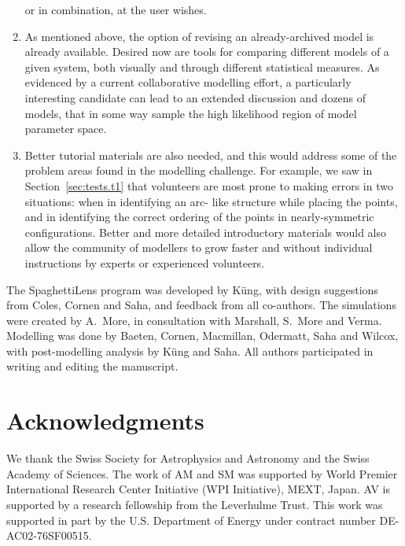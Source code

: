 \documentclass[usenatbib]{mn2e}
\newcommand{\spl}{SpaghettiLens\xspace}
\newcommand{\secref}[1]{Section~\ref{sec:#1}}
\begin{document}
\begin{enumerate}
  or in combination, at the user wishes.
\item As mentioned above, the option of revising an already-archived
  model is already available.  Desired now are tools for comparing
  different models of a given system, both visually and through
  different statistical measures.  As evidenced by a current
  collaborative modelling effort, a particularly interesting candidate
  can lead to an extended discussion and dozens of models, that
  in some way sample the high likelihood region of model parameter
  space.
\item Better tutorial materials are also needed, and this would
  address some of the problem areas found in the modelling challenge.
  For example, we saw in \secref{tests.t1} that volunteers are most
  prone to making errors in two situations: when in identifying an arc-
  like structure while placing the points, and in identifying the
  correct ordering of the points in nearly-symmetric configurations.
  Better and more detailed introductory materials would also allow
  the community of modellers to grow faster and without individual
  instructions by experts or experienced volunteers.
\end{enumerate}

The \spl program was developed by Küng, with design suggestions from
Coles, Cornen and Saha, and feedback from all co-authors.  The
simulations were created by A.~More, in consultation with Marshall,
S.~More and Verma.  Modelling was done by Baeten, Cornen, Macmillan,
Odermatt, Saha and Wilcox, with post-modelling analysis by Küng and
Saha.  All authors participated in writing and editing the manuscript.



\section*{Acknowledgments}

We thank the Swiss Society for Astrophysics and Astronomy and the
Swiss Academy of Sciences. The work of AM and SM was supported by
World Premier International Research Center Initiative (WPI
Initiative), MEXT, Japan. AV is supported by a research fellowship
from the Leverhulme Trust. This work was supported in part by the U.S.
Department of Energy under contract number DE-AC02-76SF00515.

\end{document}
